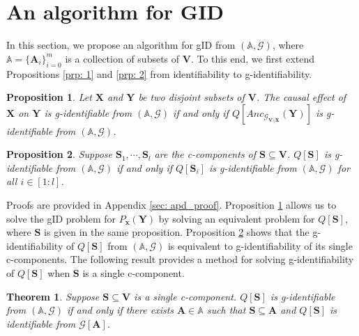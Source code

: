 \documentclass[accepted]{uai2022}
\newtheorem{theorem}{Theorem}%
\newtheorem{proposition}{Proposition}
\newcommand{\Anc}[2]{\textit{Anc}_{#2}(#1)}
\newcommand{\V}[0]{\mathbf{V}}
\newcommand{\X}[0]{\mathbf{X}}
\newcommand{\Y}[0]{\mathbf{Y}}
\newcommand{\A}[0]{\mathbf{A}}
\newcommand{\x}[0]{\mathbf{x}}
\newcommand{\G}[0]{\mathcal{G}}
\begin{document}
\section{An algorithm for GID} \label{sec: algorithm}
    In this section, we propose an algorithm for gID from $(\mathbb{A}, \G)$, where $\mathbb{A}=\{\A_i\}_{i=0}^m$ is a collection of subsets of $\V$.
    To this end, we first extend Propositions \ref{prp: 1} and \ref{prp: 2} from identifiability to g-identifiability.
    
    \begin{proposition} \label{prp: 3}
        Let $\X$ and $\Y$ be two disjoint subsets of $\V$.
        The causal effect of $\X$ on $\Y$ is g-identifiable from $(\mathbb{A},\G)$ if and only if $Q[\Anc{\Y}{\G_{\V \setminus \X}}]$ is g-identifiable from $(\mathbb{A},\G)$.
    \end{proposition}
    \begin{proposition} \label{prp: 4}
        Suppose $\mathbf{S}_1,\cdots,\mathbf{S}_l$ are the c-components of $\mathbf{S} \subseteq \V$. 
        $Q[\mathbf{S}]$ is g-identifiable from $(\mathbb{A}, \G)$ if and only if $Q[\mathbf{S}_i]$ is g-identifiable from $(\mathbb{A}, \G)$ for all $i\in [1:l]$.
    \end{proposition}
    Proofs are provided in Appendix \ref{sec: apd_proof}. 
    Proposition \ref{prp: 3} allows us to solve the gID problem for $P_{\x}(\Y)$ by solving an equivalent problem for $Q[\mathbf{S}]$, where $\mathbf{S}$ is given in the same proposition. 
    Proposition \ref{prp: 4} shows that the g-identifiability of $Q[\mathbf{S}]$ from $(\mathbb{A}, \G)$ is equivalent to g-identifiability of its single c-components. 
    The following result provides a method for solving g-identifiability of $Q[\mathbf{S}]$ when $\textbf{S}$ is a single c-component.
    \begin{theorem} \label{thm: main}
        Suppose $\mathbf{S} \subseteq \V$ is a single c-component. 
        $Q[\mathbf{S}]$ is g-identifiable from $(\mathbb{A}, \G)$ if and only if there exists $\A \in \mathbb{A}$ such that $\mathbf{S} \subseteq \A$ and $Q[\mathbf{S}]$ is identifiable from $\G[\A]$.
    \end{theorem}
\end{document}
